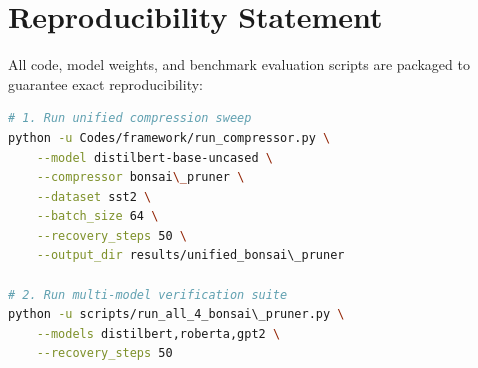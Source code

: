 \section{Reproducibility Statement}
All code, model weights, and benchmark evaluation scripts are packaged to guarantee exact reproducibility:
\begin{lstlisting}[language=bash]
# 1. Run unified compression sweep
python -u Codes/framework/run_compressor.py \
    --model distilbert-base-uncased \
    --compressor bonsai\_pruner \
    --dataset sst2 \
    --batch_size 64 \
    --recovery_steps 50 \
    --output_dir results/unified_bonsai\_pruner

# 2. Run multi-model verification suite
python -u scripts/run_all_4_bonsai\_pruner.py \
    --models distilbert,roberta,gpt2 \
    --recovery_steps 50
\end{lstlisting}
